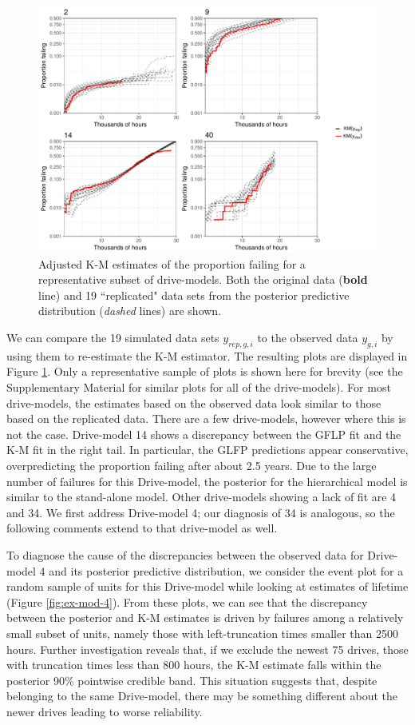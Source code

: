 \documentclass[aap]{imsart}
\begin{document}
\begin{figure}[H]
\includegraphics[width=\textwidth]{ppcheck-sample}
\caption{Adjusted K-M estimates of the proportion failing for a representative subset of drive-models. Both the original data (\textbf{bold} line) and 19 ``replicated" data sets from the posterior predictive distribution (\textit{dashed} lines) are shown.}
\label{fig:post-pred-KM}
\end{figure}

We can compare the 19 simulated data sets $y_{rep,g, i}$ to the observed data $y_{g,i}$ by using them to re-estimate the K-M estimator. The resulting plots are displayed in Figure \ref{fig:post-pred-KM}. Only a representative sample of plots is shown here for brevity (see the Supplementary Material for similar plots for all of the drive-models).  For most drive-models, the estimates based on the observed data look similar to those based on the replicated data.  There are a few drive-models, however where this is not the case. Drive-model 14 shows a discrepancy between the GFLP fit and the K-M fit in the right tail. In particular, the GLFP predictions appear conservative, overpredicting the proportion failing after about 2.5 years. Due to the large number of failures for this Drive-model, the posterior for the hierarchical model is similar to the stand-alone model. Other drive-models showing a lack of fit are 4 and 34. We first address Drive-model 4; our diagnosis of 34 is analogous, so the following comments extend to that drive-model as well.


To diagnose the cause of the discrepancies between the observed data for Drive-model 4 and its posterior predictive distribution, we consider the event plot for a random sample of units for this Drive-model while looking at estimates of lifetime (Figure \ref{fig:ex-mod-4}). From these plots, we can see that the discrepancy between the posterior and K-M estimates is driven by failures among a relatively small subset of units, namely those with left-truncation times smaller than 2500 hours. Further investigation reveals that, if we exclude the newest 75 drives, those with truncation times less than 800 hours, the K-M estimate falls within the posterior 90\% pointwise credible band. This situation suggests that, despite belonging to the same Drive-model, there may be something different about the newer drives leading to worse reliability. 
\end{document}
